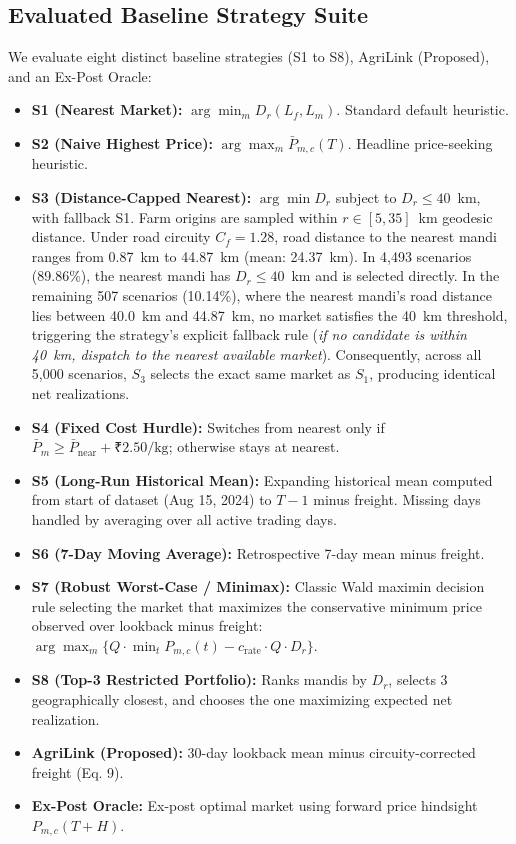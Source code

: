 \documentclass[journal]{IEEEtran}
\begin{document}
\subsection{Evaluated Baseline Strategy Suite}
We evaluate eight distinct baseline strategies (S1 to S8), AgriLink (Proposed), and an Ex-Post Oracle:
\begin{itemize}
    \item \textbf{S1 (Nearest Market):} $\arg\min_m D_r(L_f, L_m)$. Standard default heuristic.
    \item \textbf{S2 (Naive Highest Price):} $\arg\max_m \bar{P}_{m,c}(T)$. Headline price-seeking heuristic.
    \item \textbf{S3 (Distance-Capped Nearest):} $\arg\min D_r$ subject to $D_r \le 40$~km, with fallback S1. Farm origins are sampled within $r \in [5, 35]$~km geodesic distance. Under road circuity $C_f = 1.28$, road distance to the nearest mandi ranges from 0.87~km to 44.87~km (mean: 24.37~km). In 4,493 scenarios (89.86\%), the nearest mandi has $D_r \le 40$~km and is selected directly. In the remaining 507 scenarios (10.14\%), where the nearest mandi's road distance lies between 40.0~km and 44.87~km, no market satisfies the 40~km threshold, triggering the strategy's explicit fallback rule (\textit{if no candidate is within 40~km, dispatch to the nearest available market}). Consequently, across all 5,000 scenarios, $S_3$ selects the exact same market as $S_1$, producing identical net realizations.
    \item \textbf{S4 (Fixed Cost Hurdle):} Switches from nearest only if $\bar{P}_m \ge \bar{P}_{\text{near}} + \text{₹}2.50/\text{kg}$; otherwise stays at nearest.
    \item \textbf{S5 (Long-Run Historical Mean):} Expanding historical mean computed from start of dataset (Aug 15, 2024) to $T-1$ minus freight. Missing days handled by averaging over all active trading days.
    \item \textbf{S6 (7-Day Moving Average):} Retrospective 7-day mean minus freight.
    \item \textbf{S7 (Robust Worst-Case / Minimax):} Classic Wald maximin decision rule selecting the market that maximizes the conservative minimum price observed over lookback minus freight: $\arg\max_m \{ Q \cdot \min_t P_{m,c}(t) - c_{\text{rate}} \cdot Q \cdot D_r \}$.
    \item \textbf{S8 (Top-3 Restricted Portfolio):} Ranks mandis by $D_r$, selects 3 geographically closest, and chooses the one maximizing expected net realization.
    \item \textbf{AgriLink (Proposed):} 30-day lookback mean minus circuity-corrected freight (Eq. 9).
    \item \textbf{Ex-Post Oracle:} Ex-post optimal market using forward price hindsight $P_{m,c}(T+H)$.
\end{itemize}
\end{document}
